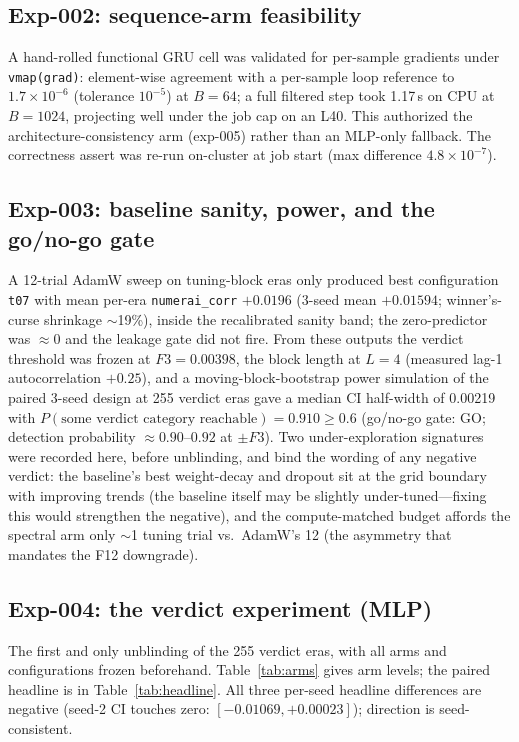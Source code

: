 \subsection{Exp-002: sequence-arm feasibility}
\label{sec:exp002}

A hand-rolled functional GRU cell was validated for per-sample gradients
under \texttt{vmap(grad)}: element-wise agreement with a per-sample loop
reference to $1.7\times10^{-6}$ (tolerance $10^{-5}$) at $B{=}64$; a full
filtered step took 1.17\,s on CPU at $B{=}1024$, projecting well under the
job cap on an L40. This authorized the architecture-consistency arm
(exp-005) rather than an MLP-only fallback. The correctness assert was
re-run on-cluster at job start (max difference $4.8\times10^{-7}$).

\subsection{Exp-003: baseline sanity, power, and the go/no-go gate}
\label{sec:exp003}

A 12-trial AdamW sweep on tuning-block eras only produced best configuration
\texttt{t07} with mean per-era \texttt{numerai\_corr} $+0.0196$
(3-seed mean $+0.01594$; winner's-curse shrinkage $\sim$19\%), inside the
recalibrated sanity band; the zero-predictor was $\approx 0$ and the leakage
gate did not fire. From these outputs the verdict threshold was frozen at
$F3 = 0.00398$, the block length at $L{=}4$ (measured lag-1 autocorrelation
$+0.25$), and a moving-block-bootstrap power simulation of the paired
3-seed design at 255 verdict eras gave a median CI half-width of 0.00219
with $P(\text{some verdict category reachable}) = 0.910 \geq 0.6$
(go/no-go gate: GO; detection probability $\approx 0.90$--$0.92$ at
$\pm F3$). Two under-exploration signatures were recorded here, before
unblinding, and bind the wording of any negative verdict: the baseline's
best weight-decay and dropout sit at the grid boundary with improving
trends (the baseline itself may be slightly under-tuned---fixing this would
strengthen the negative), and the compute-matched budget affords the
spectral arm only $\sim$1 tuning trial vs.\ AdamW's 12 (the asymmetry that
mandates the F12 downgrade).

\subsection{Exp-004: the verdict experiment (MLP)}
\label{sec:exp004}

The first and only unblinding of the 255 verdict eras, with all arms and
configurations frozen beforehand. Table~\ref{tab:arms} gives arm levels;
the paired headline is in Table~\ref{tab:headline}. All three per-seed
headline differences are negative (seed-2 CI touches zero:
$[-0.01069, +0.00023]$); direction is seed-consistent.

